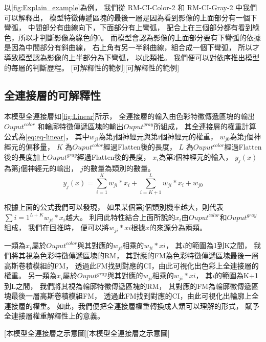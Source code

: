 \documentclass[class=NCU_thesis, crop=false]{standalone}
\begin{document}
	以\cref{fig:Explain_example}為例，
	我們從 RM-CI-Color-2 和 RM-CI-Gray-2 中我們可以解釋出，
	模型特徵傳遞區塊的最後一層是因為看到影像的上面部分有一個下彎弧，
	中間部分有曲線向下，下面部分有上彎弧，
	配合上在三個部分都有看到綠色，所以才判斷影像為綠色的0。
	而模型會認為影像的上面部分要有下彎弧的依據是因為中間部分有斜曲線，
	右上角有另一半斜曲線，組合成一個下彎弧，
	所以才導致模型認為影像的上半部分為下彎弧，
	以此類推。
	我們便可以對依序推出模型的每層的判斷歷程。
	[可解釋性的範例][可解釋性的範例]

\pagebreak

\subsection{全連接層的可解釋性}
本模型全連接層如\cref{fig:Linear}所示，
全連接層的輸入由色彩特徵傳遞區塊的輸出$Ouput^{color}$
和輪廓特徵傳遞區塊的輸出$Ouput^{gray}$所組成，
其全連接層的權重計算公式為\cref{eq:eq-linear}，
其中$w_{ji}$為第j個神經元與第i個神經元的權重，
$w_{j0}$為第j個神經元的偏移量，
$K$ 為$Ouput^{color}$經過Flatten後的長度，
$L$ 為$Ouput^{color}$經過Flatten後的長度加上$Ouput^{gray}$經過Flatten後的長度，
$x_{i}$為第i個神經元的輸入，
$y_{j}(x)$為第j個神經元的輸出，
$j$的數量為類別的數量。
\begin{equation}
    \label{eq:eq-linear}
    y_{j}(x) = \sum_{i=1}^{K}w_{ji} * x_{i} + \sum_{i=K+1}^{L}w_{ji} * x_{i} + w_{j0}
\end{equation}

根據上面的公式我們可以發現，
如果某個第j個類別機率越大，則代表$\sum{i=1}^{L+K}w_{ji} * x_{i}$越大。
利用此特性結合上面所說的$x_{i}$由$Ouput^{color}$和$Ouput^{gray}$組成，
我們在回推時，
便可以將$w_{ji} * x{i}$根據$x$的來源分為兩類。

一類為$x_{i}$屬於$Ouput^{color}$與其對應的$w_{ji}$相乘的$w_{ji} * x{i}$，
其$i$的範圍為1到K之間，
我們將其視為色彩特徵傳遞區塊的RM，
其對應的FM為色彩特徵傳遞區塊最後一層高斯卷積模組的FM，
透過此FM找到對應的CI，由此可視化出色彩上全連接層的權重。
另一類為$x_{i}$屬於$Ouput^{gray}$與其對應的$w_{ji}$相乘的$w_{ji} * x{i}$，
其$i$的範圍為K+1到L之間，
我們將其視為輪廓特徵傳遞區塊的RM，
其對應的FM為輪廓徵傳遞區塊最後一層高斯卷積模組FM，
透過此FM找到對應的CI，由此可視化出輪廓上全連接層的權重。
如此，我們便把全連接層權重轉換成人類可以理解的形式，
賦予全連接層權重解釋性上的意義。

[本模型全連接層之示意圖][本模型全連接層之示意圖]
\end{document}
